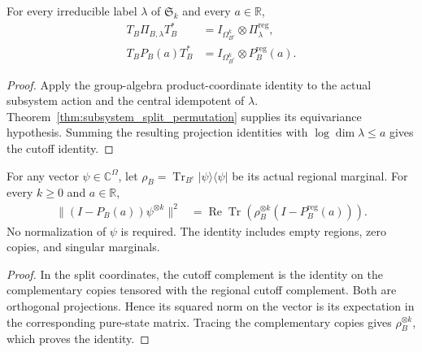 \begin{theorem}
\label{thm:subsystem_label_projection_coordinates}
    \leanok
{}
For every irreducible label $\lambda$ of $\mathfrak S_k$ and every
$a\in\mathbb R$,
\begin{align}
 T_B\Pi_{B,\lambda}T_B^*
   &=I_{\Omega_{B^c}^k}\otimes\Pi^{\mathrm{reg}}_\lambda,\\
 T_BP_B(a)T_B^*
   &=I_{\Omega_{B^c}^k}\otimes P^{\mathrm{reg}}_B(a).
\end{align}
\end{theorem}
\begin{proof}
    \leanok
Apply the group-algebra product-coordinate identity to the actual
subsystem action and the central idempotent of $\lambda$. Theorem~\ref{thm:subsystem_split_permutation} supplies its equivariance hypothesis. Summing the
resulting projection identities with $\log\dim\lambda\le a$ gives the
cutoff identity.
\end{proof}

\begin{theorem}
\label{thm:subsystem_label_cutoff_regional_trace}
    \leanok
{}
For any vector $\psi\in\mathbb C^\Omega$, let
$\rho_B=\operatorname{Tr}_{B^c}|\psi\rangle\langle\psi|$ be its
actual regional marginal. For every $k\ge0$ and $a\in\mathbb R$,
\begin{align}
 \bigl\|(I-P_B(a))\psi^{\otimes k}\bigr\|^2
 &=\operatorname{Re}\operatorname{Tr}\!\left(
    \rho_B^{\otimes k}(I-P^{\mathrm{reg}}_B(a))\right).
\end{align}
No normalization of $\psi$ is required. The identity includes empty
regions, zero copies, and singular marginals.
\end{theorem}
\begin{proof}
    \leanok
In the split coordinates, the cutoff complement is the identity on the
complementary copies tensored with the regional cutoff complement. Both
are orthogonal projections. Hence its squared norm on the vector is its
expectation in the corresponding pure-state matrix. Tracing the
complementary copies gives $\rho_B^{\otimes k}$, which proves the
identity.
\end{proof}

